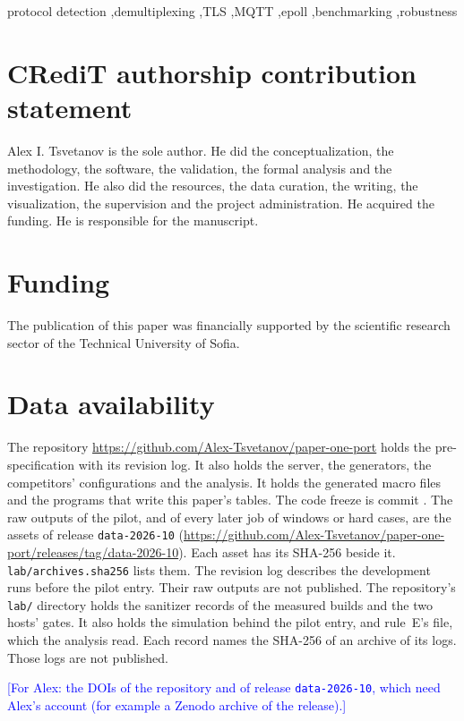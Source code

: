 \documentclass[preprint,number]{elsarticle}
\newif\ifsubmission
\newcommand{\ForAlex}[1]{\ifsubmission\PackageWarning{main}{a ForAlex note is left in the text}\else
  \textcolor{blue}{[For Alex: #1]}\fi}
\newcommand{\PaperRepoURL}{\url{https://github.com/Alex-Tsvetanov/paper-one-port}}
\newcommand{\DataRelease}{\texttt{data-2026-10}}
\newcommand{\DataReleaseURL}{\url{https://github.com/Alex-Tsvetanov/paper-one-port/releases/tag/data-2026-10}}
\newcommand{\hex}[1]{\texttt{\expandafter\seqsplit\expandafter{#1}}}
\begin{document}
\begin{frontmatter}
\begin{keyword}
protocol detection \sep demultiplexing \sep TLS \sep MQTT \sep epoll \sep benchmarking \sep robustness
\end{keyword}

\end{frontmatter}










\section*{CRediT authorship contribution statement}

Alex I. Tsvetanov is the sole author. He did the conceptualization, the methodology, the software,
the validation, the formal analysis and the investigation. He also did the resources, the data
curation, the writing, the visualization, the supervision and the project administration. He
acquired the funding. He is responsible for the manuscript.

\section*{Funding}

The publication of this paper was financially supported by the scientific research sector of the
Technical University of Sofia.

\section*{Data availability}

The repository \PaperRepoURL{} holds the pre-specification with its revision log. It also holds the
server, the generators, the competitors' configurations and the analysis. It holds the generated
macro files and the programs that write this paper's tables. The code freeze is commit
\hex{\CodeFreeze}. The raw outputs of the pilot, and of every later job of windows or hard cases,
are the assets of release \DataRelease{} (\DataReleaseURL). Each asset has its SHA-256 beside it.
\texttt{lab/archives.sha256} lists them. The revision log describes the development runs before the
pilot entry. Their raw outputs are not published. The repository's \texttt{lab/} directory holds
the sanitizer records of the measured builds and the two hosts' gates. It also holds the
simulation behind the pilot entry, and rule~E's file, which the analysis read. Each record names
the SHA-256 of an archive of its logs. Those logs are not published.
\ForAlex{the DOIs of the repository and of release \DataRelease, which need Alex's account (for
example a Zenodo archive of the release).}
\end{document}
